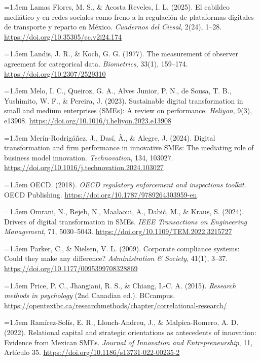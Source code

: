 {\hangindent=1.5em Lamas Flores, M. S., \& Acosta Reveles, I. L. (2025). El cabildeo mediático y en redes sociales como freno a la regulación de plataformas digitales de transporte y reparto en México. \textit{Cuadernos del Ciesal}, 2(24), 1--28. \url{https://doi.org/10.35305/cc.v2i24.174}

\hangindent=1.5em Landis, J. R., \& Koch, G. G. (1977). The measurement of observer agreement for categorical data. \textit{Biometrics}, 33(1), 159--174. \url{https://doi.org/10.2307/2529310}

\hangindent=1.5em Melo, I. C., Queiroz, G. A., Alves Junior, P. N., de Sousa, T. B., Yushimito, W. F., \& Pereira, J. (2023). Sustainable digital transformation in small and medium enterprises (SMEs): A review on performance. \textit{Heliyon}, 9(3), e13908. \url{https://doi.org/10.1016/j.heliyon.2023.e13908}

\hangindent=1.5em Merín-Rodrigáñez, J., Dasí, À., \& Alegre, J. (2024). Digital transformation and firm performance in innovative SMEs: The mediating role of business model innovation. \textit{Technovation}, 134, 103027. \url{https://doi.org/10.1016/j.technovation.2024.103027}

\hangindent=1.5em OECD. (2018). \textit{OECD regulatory enforcement and inspections toolkit}. OECD Publishing. \url{https://doi.org/10.1787/9789264303959-en}

\hangindent=1.5em Omrani, N., Rejeb, N., Maalaoui, A., Dabić, M., \& Kraus, S. (2024). Drivers of digital transformation in SMEs. \textit{IEEE Transactions on Engineering Management}, 71, 5030--5043. \url{https://doi.org/10.1109/TEM.2022.3215727}

\hangindent=1.5em Parker, C., \& Nielsen, V. L. (2009). Corporate compliance systems: Could they make any difference? \textit{Administration \& Society}, 41(1), 3--37. \url{https://doi.org/10.1177/0095399708328869}

\hangindent=1.5em Price, P. C., Jhangiani, R. S., \& Chiang, I.-C. A. (2015). \textit{Research methods in psychology} (2nd Canadian ed.). BCcampus. \url{https://opentextbc.ca/researchmethods/chapter/correlational-research/}

\hangindent=1.5em Ramírez-Solís, E. R., Llonch-Andreu, J., \& Malpica-Romero, A. D. (2022). Relational capital and strategic orientations as antecedents of innovation: Evidence from Mexican SMEs. \textit{Journal of Innovation and Entrepreneurship}, 11, Artículo 35. \url{https://doi.org/10.1186/s13731-022-00235-2}

}
